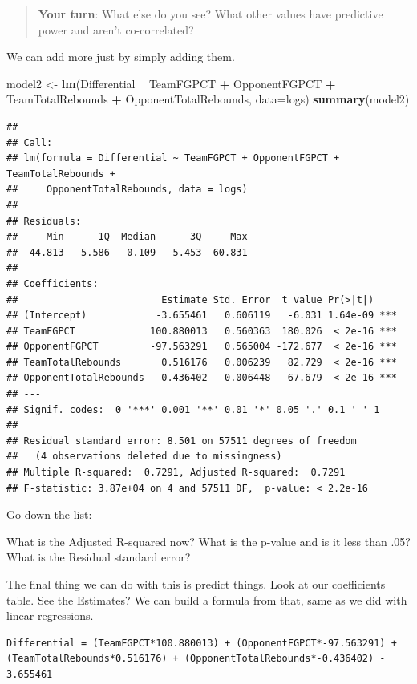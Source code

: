 \documentclass[]{book}
\newenvironment{Shaded}{\begin{snugshade}}{\end{snugshade}}
\newcommand{\KeywordTok}[1]{\textcolor[rgb]{0.13,0.29,0.53}{\textbf{#1}}}
\newcommand{\DataTypeTok}[1]{\textcolor[rgb]{0.13,0.29,0.53}{#1}}
\newcommand{\StringTok}[1]{\textcolor[rgb]{0.31,0.60,0.02}{#1}}
\newcommand{\OperatorTok}[1]{\textcolor[rgb]{0.81,0.36,0.00}{\textbf{#1}}}
\newcommand{\NormalTok}[1]{#1}
\begin{document}
\begin{quote}
\textbf{Your turn}: What else do you see? What other values have
predictive power and aren't co-correlated?
\end{quote}

We can add more just by simply adding them.

\begin{Shaded}
\begin{Highlighting}[]
\NormalTok{model2 <-}\StringTok{ }\KeywordTok{lm}\NormalTok{(Differential }\OperatorTok{~}\StringTok{ }\NormalTok{TeamFGPCT }\OperatorTok{+}\StringTok{ }\NormalTok{OpponentFGPCT }\OperatorTok{+}\StringTok{ }\NormalTok{TeamTotalRebounds }\OperatorTok{+}\StringTok{ }\NormalTok{OpponentTotalRebounds, }\DataTypeTok{data=}\NormalTok{logs)}
\KeywordTok{summary}\NormalTok{(model2)}
\end{Highlighting}
\end{Shaded}

\begin{verbatim}
## 
## Call:
## lm(formula = Differential ~ TeamFGPCT + OpponentFGPCT + TeamTotalRebounds + 
##     OpponentTotalRebounds, data = logs)
## 
## Residuals:
##     Min      1Q  Median      3Q     Max 
## -44.813  -5.586  -0.109   5.453  60.831 
## 
## Coefficients:
##                         Estimate Std. Error  t value Pr(>|t|)    
## (Intercept)            -3.655461   0.606119   -6.031 1.64e-09 ***
## TeamFGPCT             100.880013   0.560363  180.026  < 2e-16 ***
## OpponentFGPCT         -97.563291   0.565004 -172.677  < 2e-16 ***
## TeamTotalRebounds       0.516176   0.006239   82.729  < 2e-16 ***
## OpponentTotalRebounds  -0.436402   0.006448  -67.679  < 2e-16 ***
## ---
## Signif. codes:  0 '***' 0.001 '**' 0.01 '*' 0.05 '.' 0.1 ' ' 1
## 
## Residual standard error: 8.501 on 57511 degrees of freedom
##   (4 observations deleted due to missingness)
## Multiple R-squared:  0.7291, Adjusted R-squared:  0.7291 
## F-statistic: 3.87e+04 on 4 and 57511 DF,  p-value: < 2.2e-16
\end{verbatim}

Go down the list:

What is the Adjusted R-squared now? What is the p-value and is it less
than .05? What is the Residual standard error?

The final thing we can do with this is predict things. Look at our
coefficients table. See the Estimates? We can build a formula from that,
same as we did with linear regressions.

\begin{verbatim}
Differential = (TeamFGPCT*100.880013) + (OpponentFGPCT*-97.563291) + (TeamTotalRebounds*0.516176) + (OpponentTotalRebounds*-0.436402) - 3.655461
\end{verbatim}
\end{document}
